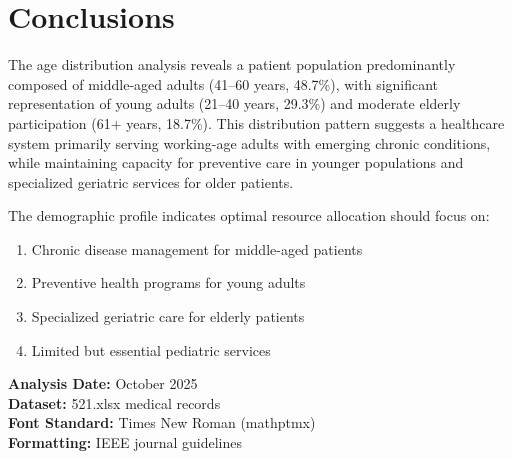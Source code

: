\documentclass[10pt]{article}
\begin{document}
\section{Conclusions}

The age distribution analysis reveals a patient population predominantly composed of middle-aged adults (41--60 years, 48.7\%), with significant representation of young adults (21--40 years, 29.3\%) and moderate elderly participation (61+ years, 18.7\%). This distribution pattern suggests a healthcare system primarily serving working-age adults with emerging chronic conditions, while maintaining capacity for preventive care in younger populations and specialized geriatric services for older patients.

The demographic profile indicates optimal resource allocation should focus on:
\begin{enumerate}
\item Chronic disease management for middle-aged patients
\item Preventive health programs for young adults
\item Specialized geriatric care for elderly patients
\item Limited but essential pediatric services
\end{enumerate}

\vspace{1cm}

\textbf{Analysis Date:} October 2025\\
\textbf{Dataset:} 521.xlsx medical records\\
\textbf{Font Standard:} Times New Roman (mathptmx)\\
\textbf{Formatting:} IEEE journal guidelines
\end{document}
